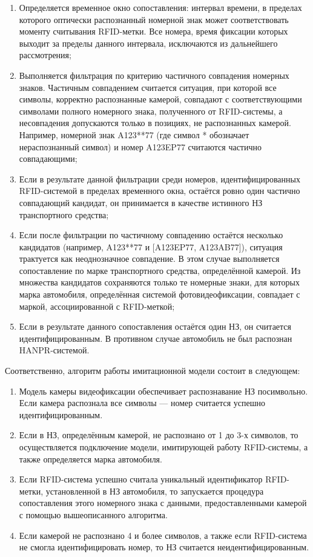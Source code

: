 \documentclass[12pt]{article}
\theoremstyle{definition}
\begin{document}
\begin{enumerate}
    \item Определяется временное окно сопоставления: интервал времени, в пределах которого оптически распознанный номерной знак может соответствовать моменту считывания RFID-метки. Все номера, время фиксации которых выходит за пределы данного интервала, исключаются из дальнейшего рассмотрения;
    \item Выполняется фильтрация по критерию частичного совпадения номерных знаков. Частичным совпадением считается ситуация, при которой все символы, корректно распознанные камерой, совпадают с соответствующими символами полного номерного знака, полученного от RFID-системы, а несовпадения допускаются только в позициях, не распознанных камерой. Например, номерной знак A123**77 (где символ * обозначает нераспознанный символ) и номер A123EP77 считаются частично совпадающими;
    \item Если в результате данной фильтрации среди номеров, идентифицированных RFID-системой в пределах временного окна, остаётся ровно один частично совпадающий кандидат, он принимается в качестве истинного НЗ транспортного средства;
    \item Если после фильтрации по частичному совпадению остаётся несколько кандидатов (например, A123**77 и [A123EP77, A123AB77]), ситуация трактуется как неоднозначное совпадение. В этом случае выполняется сопоставление по марке транспортного средства, определённой камерой. Из множества кандидатов сохраняются только те номерные знаки, для которых марка автомобиля, определённая системой фотовидеофиксации, совпадает с маркой, ассоциированной с RFID-меткой;
    \item Если в результате данного сопоставления остаётся один НЗ, он считается идентифицированным. В противном случае автомобиль не был распознан HANPR-системой.
\end{enumerate}


Соответственно, алгоритм работы имитационной модели состоит в следующем:

\begin{enumerate}
    \item Модель камеры видеофиксации обеспечивает распознавание НЗ посимвольно. Если камера распознала все символы — номер считается успешно идентифицированным.
    \item Если в НЗ, определённым камерой, не распознано от 1 до 3-х символов, то осуществляется подключение модели, имитирующей работу RFID-системы, а также определяется марка автомобиля.
    \item Если RFID-система успешно считала уникальный идентификатор RFID-метки, установленной в НЗ автомобиля, то запускается процедура сопоставления этого номерного знака с данными, предоставленными камерой с помощью вышеописанного алгоритма.
    \item Если камерой не распознано 4 и более символов, а также если RFID-система не смогла идентифицировать номер, то НЗ считается неидентифицированным.
\end{enumerate}
\end{document}
